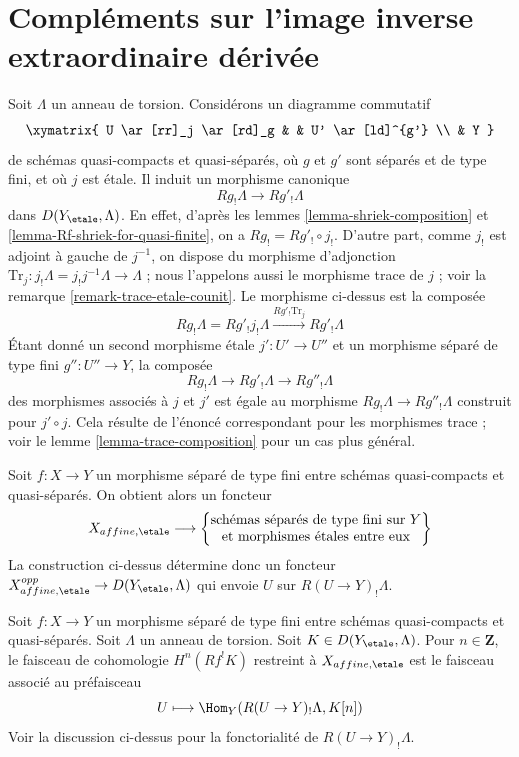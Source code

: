 






\section{Compléments sur l'image inverse extraordinaire dérivée}
\label{section-more-derived-upper-shriek}

\noindent
Soit $\Lambda$ un anneau de torsion. Considérons un diagramme commutatif
$$
\xymatrix{
U \ar[rr]_j \ar[rd]_g & & U' \ar[ld]^{g'} \\
& Y
}
$$
de schémas quasi-compacts et quasi-séparés, où $g$ et $g'$
sont séparés et de type fini, et où $j$ est étale. Il induit
un morphisme canonique
$$
Rg_!\Lambda \longrightarrow Rg'_!\Lambda
$$
dans $D(Y_\etale, \Lambda)$. En effet, d'après les lemmes \ref{lemma-shriek-composition}
et \ref{lemma-Rf-shriek-for-quasi-finite}, on a $Rg_! = Rg'_! \circ j_!$.
D'autre part, comme $j_!$ est adjoint à gauche de $j^{-1}$, on dispose du
morphisme d'adjonction $\text{Tr}_j : j_!\Lambda = j_!j^{-1}\Lambda \to \Lambda$ ;
nous l'appelons aussi le morphisme trace de $j$ ; voir la
remarque \ref{remark-trace-etale-counit}.
Le morphisme ci-dessus est la composée
$$
Rg_!\Lambda = Rg'_!j_!\Lambda
\xrightarrow{Rg'_! \text{Tr}_j}
Rg'_!\Lambda
$$
Étant donné un second morphisme étale $j' : U' \to U''$
et un morphisme séparé de type fini $g'' : U'' \to Y$,
la composée
$$
Rg_!\Lambda \longrightarrow Rg'_!\Lambda \longrightarrow Rg''_!\Lambda
$$
des morphismes associés à $j$ et $j'$ est égale au morphisme
$Rg_!\Lambda \longrightarrow Rg''_!\Lambda$ construit pour $j' \circ j$.
Cela résulte de l'énoncé correspondant pour les morphismes trace ;
voir le lemme \ref{lemma-trace-composition} pour un cas plus général.

\medskip\noindent
Soit $f : X \to Y$ un morphisme séparé de type fini entre schémas quasi-compacts
et quasi-séparés. On obtient alors un foncteur
$$
X_{affine, \etale}
\longrightarrow
\left\{
\begin{matrix}
\text{schémas séparés de type fini sur }Y\\
\text{et morphismes étales entre eux}
\end{matrix}
\right\}
$$
La construction ci-dessus détermine donc un foncteur
$X_{affine, \etale}^{opp} \to D(Y_\etale, \Lambda)$
qui envoie $U$ sur $R(U \to Y)_!\Lambda$.

\begin{lemma}
\label{lemma-describe-Rf-upper-shriek}
Soit $f : X \to Y$ un morphisme séparé de type fini entre schémas quasi-compacts
et quasi-séparés. Soit $\Lambda$ un anneau de torsion.
Soit $K \in D(Y_\etale, \Lambda)$. Pour $n \in \mathbf{Z}$, le
faisceau de cohomologie $H^n(Rf^!K)$ restreint à $X_{affine, \etale}$
est le faisceau associé au préfaisceau
$$
U \longmapsto \Hom_Y(R(U \to Y)_!\Lambda, K[n])
$$
Voir la discussion ci-dessus pour la fonctorialité de $R(U \to Y)_!\Lambda$.
\end{lemma}

